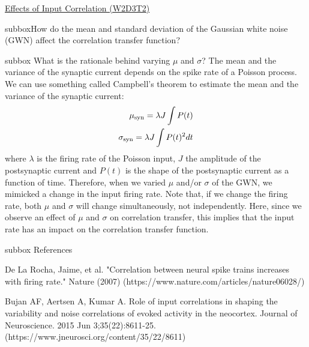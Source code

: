\begin{textbox}{\href{https://compneuro.neuromatch.io/tutorials/W1D4_GeneralizedLinearModels/student/W1D4_Tutorial1.html}{Effects of Input Correlation (W2D3T2)} }
\begin{subbox}{subbox}{How do the mean and standard deviation of the Gaussian white noise (GWN) affect the correlation transfer function?}
\end{subbox}
\begin{subbox}{subbox}{
What is the rationale behind varying $\mu$ and $\sigma$?}
\scriptsize
The mean and the variance of the synaptic current depends on the spike rate of a Poisson process. We can use something called Campbell's theorem to estimate the mean and the variance of the synaptic current:
\begin{align}
\mu_{\rm syn} = \lambda J \int P(t) \\
\sigma_{\rm syn} = \lambda J \int P(t)^2 dt
\end{align}
where $\lambda$ is the firing rate of the Poisson input, $J$ the amplitude of the postsynaptic current and $P(t)$ is the shape of the postsynaptic current as a function of time. 
Therefore, when we varied $\mu$ and/or $\sigma$ of the GWN, we mimicked a change in the input firing rate. Note that, if we change the firing rate, both $\mu$ and $\sigma$ will change simultaneously, not independently. 
Here, since we observe an effect of $\mu$ and $\sigma$ on correlation transfer, this implies that the input rate has an impact on the correlation transfer function.

\end{subbox}
\begin{subbox}{subbox}{
References}
\scriptsize


 De La Rocha, Jaime, et al. "Correlation between neural spike trains increases with firing rate." Nature (2007) (https://www.nature.com/articles/nature06028/)

  Bujan AF, Aertsen A, Kumar A. Role of input correlations in shaping the variability and noise correlations of evoked activity in the neocortex. Journal of Neuroscience. 2015 Jun 3;35(22):8611-25. (https://www.jneurosci.org/content/35/22/8611)

\end{subbox}
\end{textbox}

